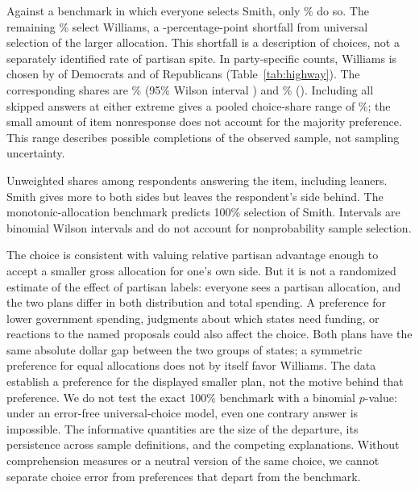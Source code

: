 \documentclass[11pt]{article}
\begin{document}
Against a benchmark in which everyone selects Smith, only \HighwayPoolLarger{}\% do so. The remaining \HighwayPoolEstimate{}\% select Williams, a \HighwayPoolEstimate{}-percentage-point shortfall from universal selection of the larger allocation. This shortfall is a description of choices, not a separately identified rate of partisan spite. In party-specific counts, Williams is chosen by \HighwayDemCount{} of \HighwayDemN{} Democrats and \HighwayRepCount{} of \HighwayRepN{} Republicans (Table~\ref{tab:highway}). The corresponding shares are \HighwayDemEstimate{}\% (95\% Wilson interval \HighwayDemCI{}) and \HighwayRepEstimate{}\% (\HighwayRepCI{}). Including all skipped answers at either extreme gives a pooled choice-share range of \HighwayPoolBounds{}\%; the small amount of item nonresponse does not account for the majority preference. This range describes possible completions of the observed sample, not sampling uncertainty.

\begin{table}[!htbp]
\centering\small
\caption{Highway choice: selecting the larger Smith plan.}
\label{tab:highway}

\begin{minipage}{\linewidth}\footnotesize
Unweighted shares among respondents answering the item, including leaners. Smith gives more to both sides but leaves the respondent's side behind. The monotonic-allocation benchmark predicts 100\% selection of Smith. Intervals are binomial Wilson intervals and do not account for nonprobability sample selection.
\end{minipage}
\end{table}

The choice is consistent with valuing relative partisan advantage enough to accept a smaller gross allocation for one's own side. But it is not a randomized estimate of the effect of partisan labels: everyone sees a partisan allocation, and the two plans differ in both distribution and total spending. A preference for lower government spending, judgments about which states need funding, or reactions to the named proposals could also affect the choice. Both plans have the same absolute dollar gap between the two groups of states; a symmetric preference for equal allocations does not by itself favor Williams. The data establish a preference for the displayed smaller plan, not the motive behind that preference. We do not test the exact 100\% benchmark with a binomial $p$-value: under an error-free universal-choice model, even one contrary answer is impossible. The informative quantities are the size of the departure, its persistence across sample definitions, and the competing explanations. Without comprehension measures or a neutral version of the same choice, we cannot separate choice error from preferences that depart from the benchmark.
\end{document}
